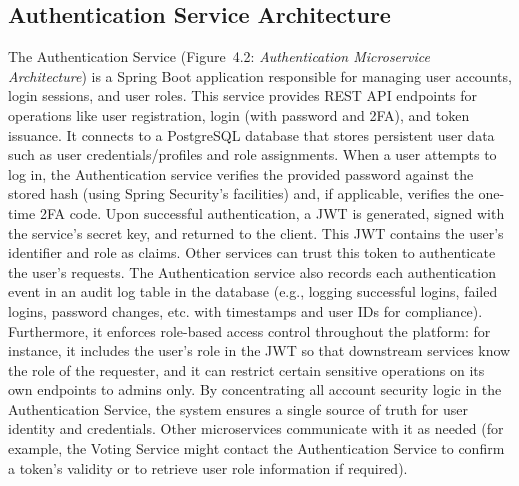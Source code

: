 \documentclass[a4paper,10pt]{report}
\begin{document}
\subsection{Authentication Service Architecture}
The Authentication Service (Figure~4.2: \emph{Authentication Microservice Architecture}) is a Spring Boot application responsible for managing user accounts, login sessions, and user roles. This service provides REST API endpoints for operations like user registration, login (with password and 2FA), and token issuance. It connects to a PostgreSQL database that stores persistent user data such as user credentials/profiles and role assignments. When a user attempts to log in, the Authentication service verifies the provided password against the stored hash (using Spring Security’s facilities) and, if applicable, verifies the one-time 2FA code. Upon successful authentication, a JWT is generated, signed with the service’s secret key, and returned to the client. This JWT contains the user’s identifier and role as claims. Other services can trust this token to authenticate the user’s requests. The Authentication service also records each authentication event in an audit log table in the database (e.g., logging successful logins, failed logins, password changes, etc. with timestamps and user IDs for compliance). Furthermore, it enforces role-based access control throughout the platform: for instance, it includes the user’s role in the JWT so that downstream services know the role of the requester, and it can restrict certain sensitive operations on its own endpoints to admins only. By concentrating all account security logic in the Authentication Service, the system ensures a single source of truth for user identity and credentials. Other microservices communicate with it as needed (for example, the Voting Service might contact the Authentication Service to confirm a token’s validity or to retrieve user role information if required).
\end{document}
